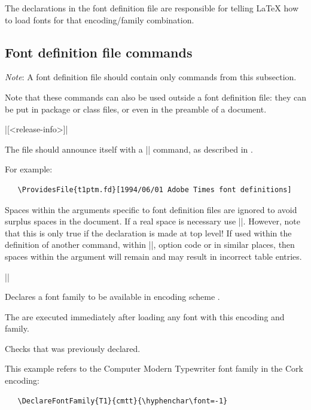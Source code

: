 \documentclass{ltxguide}[1995/11/28]
\begin{document}
The declarations in the font definition file are responsible for telling
\LaTeX{} how to load fonts for that encoding/family combination.



\subsection{Font definition file commands}

\emph{Note}: A font definition file should contain only commands from
this subsection.

Note that these commands can also be used outside a font definition
file: they can be put in package or class files, or even in the preamble
of a document.

\begin{decl}
  |[<release-info>]|
\end{decl}
The file should announce itself with a |\ProvidesFile| command, as
described in \emph{\clsguide}.

\newpage

For example:
\begin{verbatim}
   \ProvidesFile{t1ptm.fd}[1994/06/01 Adobe Times font definitions]
\end{verbatim}

Spaces within the arguments specific to font definition files are
ignored to avoid surplus spaces in the document. If a real space is
necessary use |\space|.
However, note that this is only true if the declaration is made at top
level! If used within the definition of another command, within
|\AtBeginDocument|, option code or in similar places, then spaces within
the argument will remain and may result in incorrect table entries.

\begin{decl}
  |\DeclareFontFamily|   
\end{decl}

Declares a font family  to be available in encoding scheme
.

The  are executed immediately after loading any font
with this encoding and family.

Checks that  was previously declared.

This example refers to the Computer Modern Typewriter font family in the
Cork encoding:
\begin{verbatim}
   \DeclareFontFamily{T1}{cmtt}{\hyphenchar\font=-1}
\end{verbatim}
\end{document}
